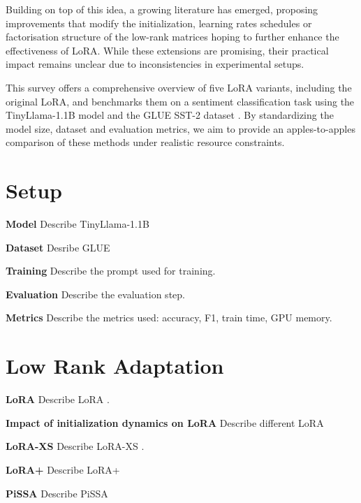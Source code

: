 \documentclass[a4paper,10pt,twocolumn,english]{article}
\begin{document}
Building on top of this idea, a growing literature has emerged, proposing improvements that modify the initialization, learning rates schedules or factorisation structure of the low-rank matrices hoping to further enhance the effectiveness of LoRA. While these extensions are promising, their practical impact remains unclear due to inconsistencies in experimental setups.

This survey offers a comprehensive overview of five LoRA variants, including the original LoRA, and benchmarks them on a sentiment classification task using the TinyLlama-1.1B model \cite{zhang2024tinyllamaopensourcesmalllanguage} and the GLUE SST-2 dataset \cite{wang2019gluemultitaskbenchmarkanalysis}. By standardizing the model size, dataset and evaluation metrics, we aim to provide an apples-to-apples comparison of these methods under realistic resource constraints.


\section{Setup}
\noindent\textbf{Model} Describe TinyLlama-1.1B \cite{zhang2024tinyllamaopensourcesmalllanguage} 

\noindent\textbf{Dataset} Desribe GLUE \cite{wang2019gluemultitaskbenchmarkanalysis}

\noindent\textbf{Training} Describe the prompt used for training.

\noindent\textbf{Evaluation} Describe the evaluation step.

\noindent\textbf{Metrics} Describe the metrics used: accuracy, F1, train time, GPU memory.

\section{Low Rank Adaptation}
\noindent\textbf{LoRA} Describe LoRA \cite{hu2021loralowrankadaptationlarge}.

\noindent\textbf{Impact of initialization dynamics on LoRA} Describe different LoRA \cite{hayou2024impactinitializationlorafinetuning}

\noindent\textbf{LoRA-XS} Describe LoRA-XS \cite{balazy2024loraxslowrankadaptationextremely}.

\noindent\textbf{LoRA+} Describe LoRA+ \cite{hayou2024loraefficientlowrank}

\noindent\textbf{PiSSA} Describe PiSSA \cite{meng2025pissaprincipalsingularvalues}
\end{document}
